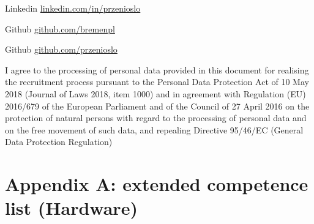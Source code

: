 \documentclass{tccv}
\begin{document}
\begin{factlist}

\vspace{\factlistspacing}
\item{Linkedin}
     {\href{http://pl.linkedin.com/in/przenioslo}{linkedin.com/in/przenioslo}}

\vspace{\factlistspacing}
\item{Github}
     {\href{http://github.com/bremenpl}{github.com/bremenpl}}

\vspace{\factlistspacing}
\item{Github}
     {\href{http://github.com/przenioslo}{github.com/przenioslo}}

\end{factlist} 

\vspace*{\fill} %

{\tiny I agree to the processing of personal data provided in this document for realising the recruitment process pursuant to the Personal Data Protection Act of 10 May 2018 (Journal of Laws 2018, item 1000) and in agreement with Regulation (EU) 2016/679 of the European Parliament and of the Council of 27 April 2016 on the protection of natural persons with regard to the processing of personal data and on the free movement of such data, and repealing Directive 95/46/EC (General Data Protection Regulation)}

\clearpage

\onecolumn

\section{Appendix A: extended competence list (Hardware)}
\end{document}
